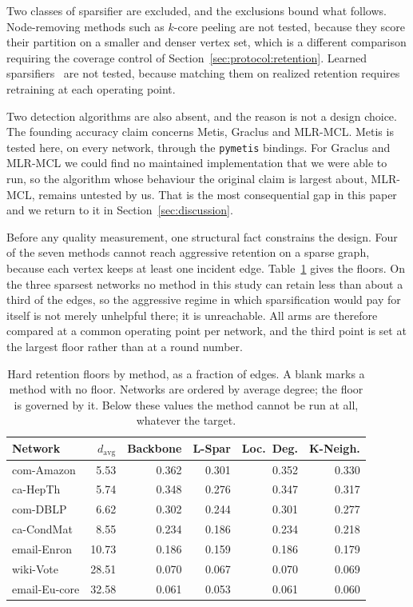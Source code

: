 Two classes of sparsifier are excluded, and the exclusions bound what follows.
Node-removing methods such as $k$-core peeling are not tested, because they score
their partition on a smaller and denser vertex set, which is a different
comparison requiring the coverage control of
Section~\ref{sec:protocol:retention}. Learned sparsifiers~\cite{wu2020gsgan} are
not tested, because matching them on realized retention requires retraining at
each operating point.

Two detection algorithms are also absent, and the reason is not a design choice.
The founding accuracy claim concerns Metis, Graclus and MLR-MCL. Metis is tested
here, on every network, through the \texttt{pymetis} bindings. For Graclus and
MLR-MCL we could find no maintained implementation that we were able to run, so
the algorithm whose behaviour the original claim is largest about, MLR-MCL,
remains untested by us. That is the most consequential gap in this paper and we
return to it in Section~\ref{sec:discussion}.

Before any quality measurement, one structural fact constrains the design. Four of
the seven methods cannot reach aggressive retention on a sparse graph, because
each vertex keeps at least one incident edge. Table~\ref{tab:floors} gives the
floors. On the three sparsest networks no method in this study can retain less
than about a third of the edges, so the aggressive regime in which sparsification
would pay for itself is not merely unhelpful there; it is unreachable. All arms
are therefore compared at a common operating point per network, and the third
point is set at the largest floor rather than at a round number.

\begin{table}[t]
\centering
\caption{Hard retention floors by method, as a fraction of edges. A blank marks a
method with no floor. Networks are ordered by average degree; the floor is
governed by it. Below these values the method cannot be run at all, whatever the
target.}
\label{tab:floors}
\small
\setlength{\tabcolsep}{4pt}
\begin{tabular}{@{}lrrrrr@{}}
\toprule
Network & $d_{\mathrm{avg}}$ & Backbone & L-Spar & Loc.\ Deg. & K-Neigh.\\
\midrule
com-Amazon    &  5.53 & 0.362 & 0.301 & 0.352 & 0.330\\
ca-HepTh      &  5.74 & 0.348 & 0.276 & 0.347 & 0.317\\
com-DBLP      &  6.62 & 0.302 & 0.244 & 0.301 & 0.277\\
ca-CondMat    &  8.55 & 0.234 & 0.186 & 0.234 & 0.218\\
email-Enron   & 10.73 & 0.186 & 0.159 & 0.186 & 0.179\\
wiki-Vote     & 28.51 & 0.070 & 0.067 & 0.070 & 0.069\\
email-Eu-core & 32.58 & 0.061 & 0.053 & 0.061 & 0.060\\
\bottomrule
\end{tabular}
\end{table}

